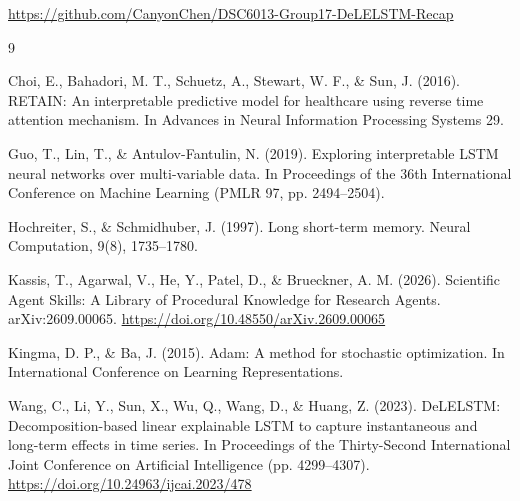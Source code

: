 \documentclass[10pt,a4paper]{article}
\begin{document}
\medskip\noindent
\url{https://github.com/CanyonChen/DSC6013-Group17-DeLELSTM-Recap}

\begin{thebibliography}{9}

 Choi, E., Bahadori, M. T., Schuetz, A., Stewart, W. F., \& Sun, J. (2016). RETAIN: An interpretable predictive model for healthcare using reverse time attention mechanism. In Advances in Neural Information Processing Systems 29.

 Guo, T., Lin, T., \& Antulov-Fantulin, N. (2019). Exploring interpretable LSTM neural networks over multi-variable data. In Proceedings of the 36th International Conference on Machine Learning (PMLR 97, pp. 2494--2504).

 Hochreiter, S., \& Schmidhuber, J. (1997). Long short-term memory. Neural Computation, 9(8), 1735--1780.

 Kassis, T., Agarwal, V., He, Y., Patel, D., \& Brueckner, A. M. (2026). Scientific Agent Skills: A Library of Procedural Knowledge for Research Agents. arXiv:2609.00065. \url{https://doi.org/10.48550/arXiv.2609.00065}

 Kingma, D. P., \& Ba, J. (2015). Adam: A method for stochastic optimization. In International Conference on Learning Representations.

 Wang, C., Li, Y., Sun, X., Wu, Q., Wang, D., \& Huang, Z. (2023). DeLELSTM: Decomposition-based linear explainable LSTM to capture instantaneous and long-term effects in time series. In Proceedings of the Thirty-Second International Joint Conference on Artificial Intelligence (pp. 4299--4307). \url{https://doi.org/10.24963/ijcai.2023/478}

\end{thebibliography}
\end{document}

